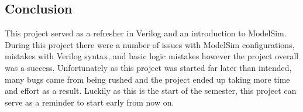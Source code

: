 \documentclass[12pt,letterpaper,titlepage]{article}
\begin{document}
\begin{raggedright}
\section{Conclusion}

This project served as a refresher in Verilog and an introduction to ModelSim. During this project there were a  number of issues with ModelSim configurations, mistakes with Verilog syntax, and basic logic mistakes however the project overall was a success. Unfortunately as this project was started far later than intended, many bugs came from being rushed and the project ended up taking more time and effort as a result. Luckily as this is the start of the semester, this project can serve as a reminder to start early from now on.

\end{raggedright}
\end{document}
